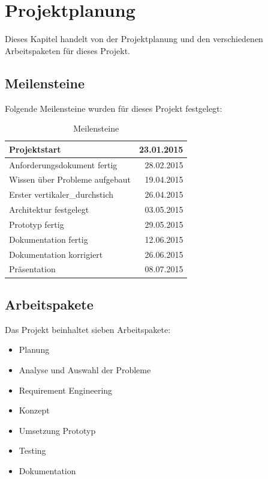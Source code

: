 %
%

\chapter{Projektplanung}\label{chap.projektplanung}
Dieses Kapitel handelt von der Projektplanung und den verschiedenen Arbeitspaketen für dieses Projekt.

\section{Meilensteine}\label{meilensteine}
Folgende Meilensteine wurden für dieses Projekt festgelegt:

\begin{table}[ht]
\centering
  \begin{tabular}{ l | r }
	\hline
	\rowcolor{gray}
	\textbf{Projektstart}			&	\textbf{23.01.2015}\\ \hline
	Anforderungsdokument fertig		&	28.02.2015	\\ \hline
	Wissen über Probleme aufgebaut		&	19.04.2015	\\ \hline
	Erster \gls{vertikaler_durchstich}		& 	26.04.2015	\\ \hline
	Architektur festgelegt			&	03.05.2015	\\ \hline
	Prototyp fertig				&	29.05.2015	\\ \hline
	Dokumentation fertig			&	12.06.2015	\\ \hline
	Dokumentation korrigiert			&	26.06.2015	\\ \hline
	Präsentation					&	08.07.2015 \\ \hline
  \end{tabular}
   \caption{Meilensteine}\label{table:milestones}
\end{table}

\section{Arbeitspakete}\label{arbeitspakete}
Das Projekt beinhaltet sieben Arbeitspakete:
\begin{itemize}
\item Planung
\item Analyse und Auswahl der Probleme
\item Requirement Engineering
\item Konzept
\item Umsetzung Prototyp
\item Testing
\item Dokumentation
\end{itemize}

